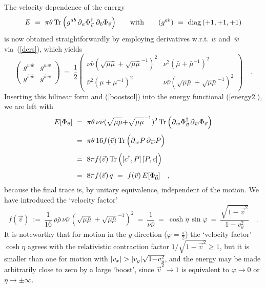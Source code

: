 \documentclass[a4paper,11pt]{article}
\numberwithin{equation}{section}
\def\pa{\mbox{$\partial$}}
\def\sfrac#1#2{{\textstyle\frac{#1}{#2}}}
\newcommand{\cdag}{c^{\dagger}}
\newcommand{\wb}{\overline{w}}
\begin{document}
The velocity dependence of the energy
\begin{equation} \label{energy2}
E\ =\ \pi \theta \,\mbox{Tr}\,\Bigl(
g^{ab}\,\pa_a\Phi_{\vec v}^\dagger\;\pa_b\Phi_{\vec v} \Bigr)
\qquad\textrm{with}\qquad
(g^{ab})\ =\ \textrm{diag}\,(+1,+1,+1)
\end{equation}
is now obtained straightforwardly by employing derivatives
w.r.t. $w$ and~$\wb$ via~(\ref{ders}), which yields
\begin{equation}
\begin{pmatrix} g^{w\wb} & g^{ww} \\[4pt] g^{\wb\wb} & g^{\wb w} \end{pmatrix}
\ =\ \frac12 \begin{pmatrix}
\nu\bar\nu(\sqrt{\mu\bar\mu}{+}\sqrt{\mu\bar\mu}^{-1})^2 &
\nu^2(\bar{\mu}{+}\bar{\mu}^{-1})^2 \\[4pt]
\bar\nu^2(\mu{+}\mu^{-1})^2 &
\nu\bar\nu(\sqrt{\mu\bar\mu}{+}\sqrt{\mu\bar\mu}^{-1})^2
\end{pmatrix} \quad.
\end{equation}
Inserting this bilinear form and (\ref{boostsol}) into the energy functional
(\ref{energy2}), we are left with~\cite{LPS2}
\begin{align}
E[\Phi_{\vec v}]\
&=\ \pi\theta\,\nu\bar\nu(\sqrt{\mu\bar\mu}{+}\sqrt{\mu\bar\mu}^{-1})^2\,
\mbox{Tr}\,\Bigl(\pa_w \Phi_{\vec v}^\dagger\,\pa_{\wb}\Phi_{\vec v} \Bigr)
\nonumber\\[4pt]
&=\ \pi\theta\,16 f(\vec{v})\,\mbox{Tr}\,
\Bigl( \pa_w P\,\pa_{\wb} P \Bigr) \nonumber\\[4pt]
&=\ 8\pi f(\vec{v})\,\mbox{Tr}\,\Bigl([\cdag,P]\,[P,c]\Bigr) \nonumber\\[4pt]
&=\ 8\pi f(\vec{v})\,q\ =\
f(\vec{v})\,E[\Phi_{\vec 0}] \quad, \label{boostE}
\end{align}
because the final trace is, by unitary equivalence, independent of the motion.
We have introduced the `velocity factor'
\begin{equation}
f(\vec{v})\ :=\ \sfrac{1}{16}\,\rho\bar\rho\,\nu\bar\nu\,
(\sqrt{\mu\bar\mu}+\sqrt{\mu\bar\mu}^{-1})^2\ =\
\frac{1}{\nu\bar\nu}\ =\
\cosh\eta\,\sin\varphi\ =\
\frac{\sqrt{1-\vec v^2}}{1-v_y^2} \quad.
\end{equation}
It is noteworthy that for motion in the $y$ direction ($\varphi{=}\frac\pi2$)
the `velocity factor'~$\cosh\eta$ agrees with the relativistic contraction factor
$1/\sqrt{1{-}\vec v^2}\ge1$, but it is smaller than one for motion with
$|v_x|>|v_y|\sqrt{1{-}\smash{v_y^2}}$, and the energy may be made arbitrarily
close to zero by a large `boost',
since $\vec v^2\to1$ is equivalent to $\varphi\to0$ or $\eta\to\pm\infty$.
\end{document}
